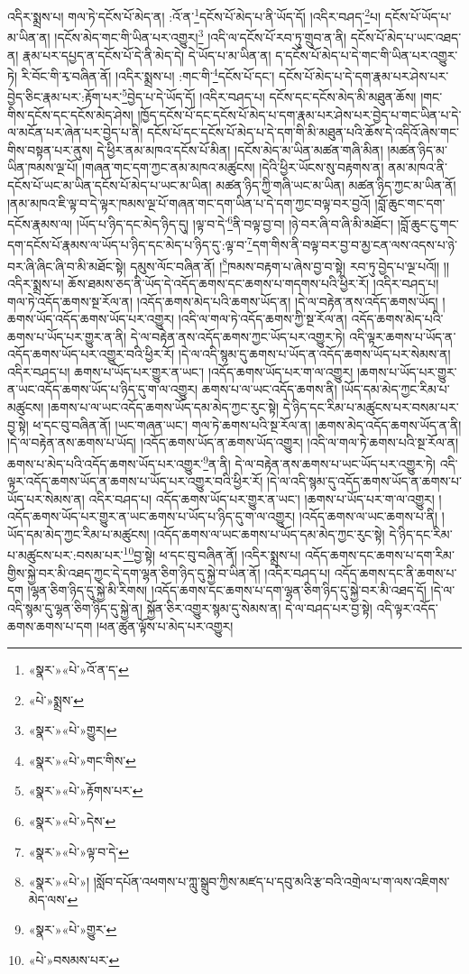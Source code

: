 འདིར་སྨྲས་པ། གལ་ཏེ་དངོས་པོ་མེད་ན། :འོ་ན་\footnote{«སྣར་»«པེ་»འོ་ན་ད་}དངོས་པོ་མེད་པ་ནི་ཡོད་དོ། །འདིར་བཤད་\footnote{«པེ་»སྨྲས་}པ། དངོས་པོ་ཡོད་པ་མ་ཡིན་ན། །དངོས་མེད་གང་གི་ཡིན་པར་འགྱུར།\footnote{«སྣར་»«པེ་»གྱུར།} །འདི་ལ་དངོས་པོ་རབ་ཏུ་གྲུབ་ན་ནི། དངོས་པོ་མེད་པ་ཡང་འཐད་ན། རྣམ་པར་དཔྱད་ན་དངོས་པོ་དེ་ནི་མེད་དེ། དེ་ཡོད་པ་མ་ཡིན་ན། ད་དངོས་པོ་མེད་པ་དེ་གང་གི་ཡིན་པར་འགྱུར་ཏེ། རི་བོང་གི་རྭ་བཞིན་ནོ། །འདིར་སྨྲས་པ། :གང་གི་\footnote{«སྣར་»«པེ་»གང་གིས་}དངོས་པོ་དང་། དངོས་པོ་མེད་པ་དེ་དག་རྣམ་པར་ཤེས་པར་བྱེད་ཅིང་རྣམ་པར་:རྟོག་པར་\footnote{«སྣར་»«པེ་»རྟོགས་པར་}བྱེད་པ་དེ་ཡོད་དོ། །འདིར་བཤད་པ། དངོས་དང་དངོས་མེད་མི་མཐུན་ཆོས། །གང་གིས་དངོས་དང་དངོས་མེད་ཤེས། །ཁྱོད་དངོས་པོ་དང་དངོས་པོ་མེད་པ་དག་རྣམ་པར་ཤེས་པར་བྱེད་པ་གང་ཡིན་པ་དེ་ལ་མངོན་པར་ཞེན་པར་བྱེད་པ་ནི། དངོས་པོ་དང་དངོས་པོ་མེད་པ་དེ་དག་གི་མི་མཐུན་པའི་ཆོས་དེ་འདིའོ་ཞེས་གང་གིས་བསྟན་པར་ནུས། དེ་ཕྱིར་ནམ་མཁའ་དངོས་པོ་མིན། །དངོས་མེད་མ་ཡིན་མཚན་གཞི་མིན། །མཚན་ཉིད་མ་ཡིན་ཁམས་ལྔ་པོ། །གཞན་གང་དག་ཀྱང་ནམ་མཁའ་མཚུངས། །དེའི་ཕྱིར་ཡོངས་སུ་བརྟགས་ན། ནམ་མཁའ་ནི་དངོས་པོ་ཡང་མ་ཡིན་དངོས་པོ་མེད་པ་ཡང་མ་ཡིན། མཚན་ཉིད་ཀྱི་གཞི་ཡང་མ་ཡིན། མཚན་ཉིད་ཀྱང་མ་ཡིན་ནོ། །ནམ་མཁའ་ཇི་ལྟ་བ་དེ་ལྟར་ཁམས་ལྔ་པོ་གཞན་གང་དག་ཡིན་པ་དེ་དག་ཀྱང་བལྟ་བར་བྱའོ། །བློ་ཆུང་གང་དག་དངོས་རྣམས་ལ། །ཡོད་པ་ཉིད་དང་མེད་ཉིད་དུ། །ལྟ་བ་དེ་\footnote{«སྣར་»«པེ་»དེས་}ནི་བལྟ་བྱ་བ། །ཉེ་བར་ཞི་བ་ཞི་མི་མཐོང་། །བློ་ཆུང་ངུ་གང་དག་དངོས་པོ་རྣམས་ལ་ཡོད་པ་ཉིད་དང་མེད་པ་ཉིད་དུ་:ལྟ་བ་\footnote{«སྣར་»«པེ་»ལྟ་བ་དེ་}དག་གིས་ནི་བལྟ་བར་བྱ་བ་མྱ་ངན་ལས་འདས་པ་ཉེ་བར་ཞི་ཞིང་ཞི་བ་མི་མཐོང་སྟེ། དམུས་ལོང་བཞིན་ནོ། །\footnote{«སྣར་»«པེ་»། །སློབ་དཔོན་འཕགས་པ་ཀླུ་སྒྲུབ་ཀྱིས་མཛད་པ་དབུ་མའི་རྩ་བའི་འགྲེལ་པ་ག་ལས་འཇིགས་མེད་ལས་}ཁམས་བརྟག་པ་ཞེས་བྱ་བ་སྟེ། རབ་ཏུ་བྱེད་པ་ལྔ་པའོ།། །།འདིར་སྨྲས་པ། ཆོས་ཐམས་ཅད་ནི་ཡོད་དེ་འདོད་ཆགས་དང་ཆགས་པ་གདགས་པའི་ཕྱིར་རོ། །འདིར་བཤད་པ། གལ་ཏེ་འདོད་ཆགས་སྔ་རོལ་ན། །འདོད་ཆགས་མེད་པའི་ཆགས་ཡོད་ན། །དེ་ལ་བརྟེན་ནས་འདོད་ཆགས་ཡོད། །ཆགས་ཡོད་འདོད་ཆགས་ཡོད་པར་འགྱུར། །འདི་ལ་གལ་ཏེ་འདོད་ཆགས་ཀྱི་སྔ་རོལ་ན། འདོད་ཆགས་མེད་པའི་ཆགས་པ་ཡོད་པར་གྱུར་ན་ནི། དེ་ལ་བརྟེན་ནས་འདོད་ཆགས་ཀྱང་ཡོད་པར་འགྱུར་ཏེ། འདི་ལྟར་ཆགས་པ་ཡོད་ན་འདོད་ཆགས་ཡོད་པར་འགྱུར་བའི་ཕྱིར་རོ། །དེ་ལ་འདི་སྙམ་དུ་ཆགས་པ་ཡོད་ན་འདོད་ཆགས་ཡོད་པར་སེམས་ན། འདིར་བཤད་པ། ཆགས་པ་ཡོད་པར་གྱུར་ན་ཡང་། །འདོད་ཆགས་ཡོད་པར་ག་ལ་འགྱུར། །ཆགས་པ་ཡོད་པར་གྱུར་ན་ཡང་འདོད་ཆགས་ཡོད་པ་ཉིད་དུ་ག་ལ་འགྱུར། ཆགས་པ་ལ་ཡང་འདོད་ཆགས་ནི། །ཡོད་དམ་མེད་ཀྱང་རིམ་པ་མཚུངས། །ཆགས་པ་ལ་ཡང་འདོད་ཆགས་ཡོད་དམ་མེད་ཀྱང་རུང་སྟེ། དེ་ཉིད་དང་རིམ་པ་མཚུངས་པར་བསམ་པར་བྱ་སྟེ། ཕ་དང་བུ་བཞིན་ནོ། །ཡང་གཞན་ཡང་། གལ་ཏེ་ཆགས་པའི་སྔ་རོལ་ན། །ཆགས་མེད་འདོད་ཆགས་ཡོད་ན་ནི། །དེ་ལ་བརྟེན་ནས་ཆགས་པ་ཡོད། །འདོད་ཆགས་ཡོད་ན་ཆགས་ཡོད་འགྱུར། །འདི་ལ་གལ་ཏེ་ཆགས་པའི་སྔ་རོལ་ན། ཆགས་པ་མེད་པའི་འདོད་ཆགས་ཡོད་པར་འགྱུར་\footnote{«སྣར་»«པེ་»གྱུར་}ན་ནི། དེ་ལ་བརྟེན་ནས་ཆགས་པ་ཡང་ཡོད་པར་འགྱུར་ཏེ། འདི་ལྟར་འདོད་ཆགས་ཡོད་ན་ཆགས་པ་ཡོད་པར་འགྱུར་བའི་ཕྱིར་རོ། །དེ་ལ་འདི་སྙམ་དུ་འདོད་ཆགས་ཡོད་ན་ཆགས་པ་ཡོད་པར་སེམས་ན། འདིར་བཤད་པ། འདོད་ཆགས་ཡོད་པར་གྱུར་ན་ཡང་། །ཆགས་པ་ཡོད་པར་ག་ལ་འགྱུར། །འདོད་ཆགས་ཡོད་པར་གྱུར་ན་ཡང་ཆགས་པ་ཡོད་པ་ཉིད་དུ་ག་ལ་འགྱུར། །འདོད་ཆགས་ལ་ཡང་ཆགས་པ་ནི། །ཡོད་དམ་མེད་ཀྱང་རིམ་པ་མཚུངས། །འདོད་ཆགས་ལ་ཡང་ཆགས་པ་ཡོད་དམ་མེད་ཀྱང་རུང་སྟེ། དེ་ཉིད་དང་རིམ་པ་མཚུངས་པར་:བསམ་པར་\footnote{«པེ་»བསམས་པར་}བྱ་སྟེ། ཕ་དང་བུ་བཞིན་ནོ། །འདིར་སྨྲས་པ། འདོད་ཆགས་དང་ཆགས་པ་དག་རིམ་གྱིས་སྐྱེ་བར་མི་འཐད་ཀྱང་དེ་དག་ལྷན་ཅིག་ཉིད་དུ་སྐྱེ་བ་ཡིན་ནོ། །འདིར་བཤད་པ། འདོད་ཆགས་དང་ནི་ཆགས་པ་དག །ལྷན་ཅིག་ཉིད་དུ་སྐྱེ་མི་རིགས། །འདོད་ཆགས་དང་ཆགས་པ་དག་ལྷན་ཅིག་ཉིད་དུ་སྐྱེ་བར་མི་འཐད་དོ། །དེ་ལ་འདི་སྙམ་དུ་ལྷན་ཅིག་ཉིད་དུ་སྐྱེ་ན། སྐྱོན་ཅིར་འགྱུར་སྙམ་དུ་སེམས་ན། དེ་ལ་བཤད་པར་བྱ་སྟེ། འདི་ལྟར་འདོད་ཆགས་ཆགས་པ་དག །ཕན་ཚུན་ལྟོས་པ་མེད་པར་འགྱུར། 